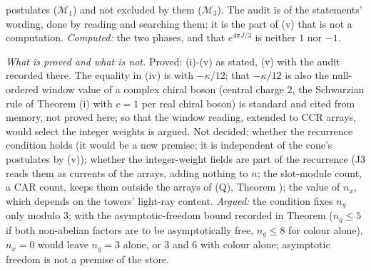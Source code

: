 postulates ($\mathcal{M}_{1}$) and not excluded by them ($\mathcal{M}_{3}$). The audit is of the statements' wording, done by reading and searching them; it is the part of (v) that is not a computation. \emph{Computed:} the two phases, and that $e^{4\pi J/3}$ is neither $1$ nor $-1$.

\emph{What is proved and what is not.} Proved: (i)-(v) as stated, (v) with the audit recorded there. The equality in (iv) is with $-\kappa/12$; that $-\kappa/12$ is also the null-ordered window value of a complex chiral boson (central charge $2$, the Schwarzian rule of Theorem (i) with $c = 1$ per real chiral boson) is standard and cited from memory, not proved here; so that the window reading, extended to CCR arrays, would select the integer weights is argued. Not decided: whether the recurrence condition holds (it would be a new premise; it is independent of the cone's postulates by (v)); whether the integer-weight fields are part of the recurrence (J3 reads them as currents of the arrays, adding nothing to $n$; the slot-module count, a CAR count, keeps them outside the arrays of (Q), Theorem ); the value of $n_{x}$, which depends on the towers' light-ray content. \emph{Argued:} the condition fixes $n_{g}$ only modulo $3$; with the asymptotic-freedom bound recorded in Theorem  ($n_{g} \le 5$ if both non-abelian factors are to be asymptotically free, $n_{g} \le 8$ for colour alone), $n_{x} = 0$ would leave $n_{g} = 3$ alone, or $3$ and $6$ with colour alone; asymptotic freedom is not a premise of the store.
